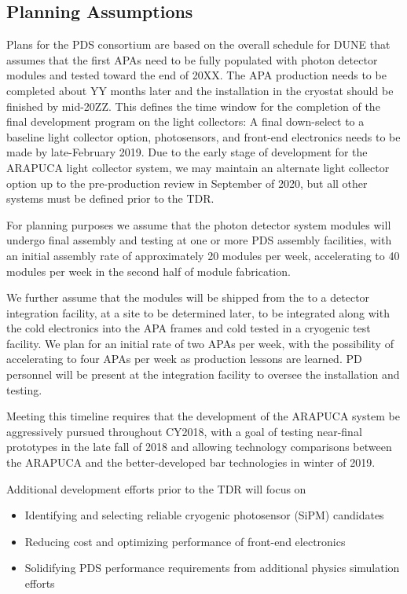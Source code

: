 \subsection{Planning Assumptions}
\label{sec:fdsp-pd-org-assmp}

Plans for the PDS consortium are based on the overall schedule for DUNE that assumes that the first APAs need to be fully populated with photon detector modules and tested toward the end of 20XX. The APA production needs to be completed about YY months later and the installation in the cryostat should be
finished by mid-20ZZ.  This defines the time window for the completion of the final development program on the light collectors: A final down-select to a baseline light collector option, photosensors, and front-end electronics needs to be made by late-February 2019.  Due to the early stage of development for the ARAPUCA light collector system, we may maintain an alternate light collector option up to the pre-production review in September of 2020, but all other systems must be defined prior to the TDR. 

For planning purposes we assume that the photon detector system modules will undergo final assembly and testing at one or more PDS assembly facilities, with an initial 
assembly rate of approximately 20 modules per week, accelerating to 40 modules per week in the second half of module fabrication.

We further assume that the modules will be shipped from the to a detector integration facility, at a site to be determined later, to be integrated along with the cold electronics into the APA frames and cold tested in a cryogenic test facility.  We plan for an initial rate of two APAs per week, with the possibility of accelerating to four APAs per week as production lessons are learned.  PD personnel will be present at the integration facility to oversee the installation and testing.

Meeting this timeline requires that the development of the ARAPUCA system be aggressively pursued throughout CY2018, with a goal of testing near-final prototypes in the late fall of 2018 and allowing technology comparisons between the ARAPUCA and the better-developed bar technologies in winter of 2019.

Additional development efforts prior to the TDR will focus on

\begin{itemize}
\item Identifying and selecting reliable cryogenic photosensor (SiPM) candidates
\item Reducing cost and optimizing performance of front-end electronics
\item Solidifying PDS performance requirements from additional physics simulation efforts
\end{itemize}

